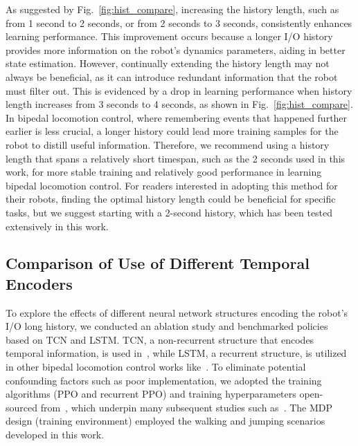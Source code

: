 {As suggested by Fig.~\ref{fig:hist_compare}, increasing the history length, such as from 1 second to 2 seconds, or from 2 seconds to 3 seconds, consistently enhances learning performance. This improvement occurs because a longer I/O history provides more information on the robot's dynamics parameters, aiding in better state estimation. However, continually extending the history length may not always be beneficial, as it can introduce redundant information that the robot must filter out. This is evidenced by a drop in learning performance when history length increases from 3 seconds to 4 seconds, as shown in Fig.~\ref{fig:hist_compare}. 
In bipedal locomotion control, where remembering events that happened further earlier is less crucial, a longer history could lead more training samples for the robot to distill useful information. 
Therefore, we recommend using a history length that spans a relatively short timespan, such as the 2 seconds used in this work, for more stable training and relatively good performance in learning bipedal locomotion control. For readers interested in adopting this method for their robots, finding the optimal history length could be beneficial for specific tasks, but we suggest starting with a 2-second history, which has been tested extensively in this work.


}



\subsection{Comparison of Use of Different Temporal Encoders}\label{appendix:lstm_tcn}






To explore the effects of different neural network structures encoding the robot's I/O long history, we conducted an ablation study and benchmarked policies based on TCN and LSTM. TCN, a non-recurrent structure that encodes temporal information, is used in~\cite{lee2020learning}, while LSTM, a recurrent structure, is utilized in other bipedal locomotion control works like~\cite{siekmann2020learning}. To eliminate potential confounding factors such as poor implementation, we adopted the training algorithms (PPO and recurrent PPO) and training hyperparameters open-sourced from~\cite{siekmann2020learning}, which underpin many subsequent studies such as~\cite{siekmann2021blind, siekmann2021sim, crowley2023optimizing}. The MDP design (training environment) employed the walking and jumping scenarios developed in this work.

